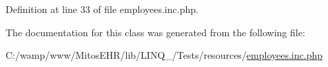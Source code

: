 \-Definition at line 33 of file employees.\-inc.\-php.



\-The documentation for this class was generated from the following file\-:\begin{DoxyCompactItemize}
\item 
\-C\-:/wamp/www/\-Mitos\-E\-H\-R/lib/\-L\-I\-N\-Q\-\_/\-Tests/resources/\hyperlink{employees_8inc_8php}{employees.\-inc.\-php}\end{DoxyCompactItemize}
